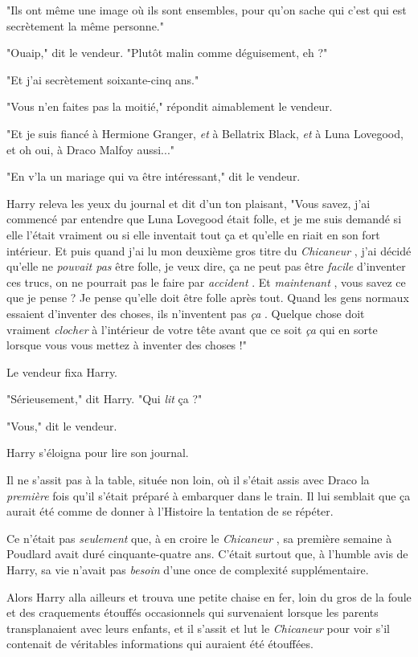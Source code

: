 "Ils ont même une image où ils sont ensembles, pour qu'on sache qui c'est qui est secrètement la même personne."

"Ouaip," dit le vendeur. "Plutôt malin comme déguisement, eh ?"

"Et j'ai secrètement soixante-cinq ans."

"Vous n'en faites pas la moitié," répondit aimablement le vendeur.

"Et je suis fiancé à Hermione Granger, \emph{et}  à Bellatrix Black, \emph{et}  à Luna Lovegood, et oh oui, à Draco Malfoy aussi..."

"En v'la un mariage qui va être intéressant," dit le vendeur.

Harry releva les yeux du journal et dit d'un ton plaisant, "Vous savez, j'ai commencé par entendre que Luna Lovegood était folle, et je me suis demandé si elle l'était vraiment ou si elle inventait tout ça et qu'elle en riait en son fort intérieur. Et puis quand j'ai lu mon deuxième gros titre du \emph{Chicaneur} , j'ai décidé qu'elle ne \emph{pouvait pas}  être folle, je veux dire, ça ne peut pas être \emph{facile}  d'inventer ces trucs, on ne pourrait pas le faire par \emph{accident} . Et \emph{maintenant} , vous savez ce que je pense ? Je pense qu'elle doit être folle après tout. Quand les gens normaux essaient d'inventer des choses, ils n'inventent pas \emph{ça} . Quelque chose doit vraiment \emph{clocher}  à l'intérieur de votre tête avant que ce soit \emph{ça}  qui en sorte lorsque vous vous mettez à inventer des choses !"

Le vendeur fixa Harry.

"Sérieusement," dit Harry. "Qui \emph{lit}  ça ?"

"Vous," dit le vendeur.

Harry s'éloigna pour lire son journal.

Il ne s'assit pas à la table, située non loin, où il s'était assis avec Draco la \emph{première}  fois qu'il s'était préparé à embarquer dans le train. Il lui semblait que ça aurait été comme de donner à l'Histoire la tentation de se répéter.

Ce n'était pas \emph{seulement}  que, à en croire le \emph{Chicaneur} , sa première semaine à Poudlard avait duré cinquante-quatre ans. C'était surtout que, à l'humble avis de Harry, sa vie n'avait pas \emph{besoin}  d'une once de complexité supplémentaire.

Alors Harry alla ailleurs et trouva une petite chaise en fer, loin du gros de la foule et des craquements étouffés occasionnels qui survenaient lorsque les parents transplanaient avec leurs enfants, et il s'assit et lut le \emph{Chicaneur}  pour voir s'il contenait de véritables informations qui auraient été étouffées.

